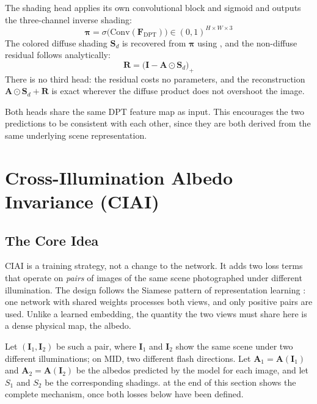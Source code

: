 The shading head applies its own convolutional block and sigmoid and outputs the
three-channel inverse shading:
\begin{equation}
  \boldsymbol{\pi} = \sigma\bigl(\text{Conv}(\mathbf{F}_{\text{DPT}})\bigr)
  \in (0, 1)^{H \times W \times 3}
  \label{eq:shading_head}
\end{equation}
The colored diffuse shading $\mathbf{S}_d$ is recovered from $\boldsymbol{\pi}$
using , and the non-diffuse residual follows analytically:
\begin{equation}
  \mathbf{R} = \bigl(\mathbf{I} - \mathbf{A} \odot \mathbf{S}_d\bigr)_{+}
  \label{eq:residual}
\end{equation}
There is no third head: the residual costs no parameters, and the reconstruction
$\mathbf{A} \odot \mathbf{S}_d + \mathbf{R}$ is exact wherever the diffuse
product does not overshoot the image.

Both heads share the same DPT feature map as input.
This encourages the two predictions to be consistent with each other, since they
are both derived from the same underlying scene representation.




\section{Cross-Illumination Albedo Invariance (CIAI)}
\label{sec:ciai}

\subsection{The Core Idea}

CIAI is a training strategy, not a change to the network.
It adds two loss terms that operate on \emph{pairs} of images of the same scene
photographed under different illumination. The design follows the Siamese pattern of
representation learning : one network with shared weights processes
both views, and only positive pairs are used. Unlike a learned embedding, the quantity the
two views must share here is a dense physical map, the albedo.

Let $(\mathbf{I}_1, \mathbf{I}_2)$ be such a pair, where $\mathbf{I}_1$ and
$\mathbf{I}_2$ show the same scene under two different illuminations; on MID, two
different flash directions.
Let $\mathbf{A}_1 = \mathbf{A}(\mathbf{I}_1)$ and $\mathbf{A}_2 = \mathbf{A}(\mathbf{I}_2)$
be the albedos predicted by the model for each image, and let $S_1$ and $S_2$ be
the corresponding shadings.
 at the end of this section shows the complete mechanism, once
both losses below have been defined.

